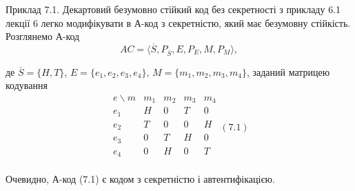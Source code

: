 \begin{example}
    Приклад 7.1. Декартовий безумовно стійкий код без секретності з прикладу
    6.1 лекції 6 легко модифікувати в А-код з секретністю, який має безумовну
    стійкість. Розглянемо А-код
    \begin{equation*}
        AC = \langle \overline{S}, P_{\overline{S}}, E, P_E, M, P_M \rangle,
    \end{equation*}
    
    де $\overline{S} = \{H, T\}$, $E = \{e_1, e_2, e_3, e_4\}$, $M = \{m_1, m_2, m_3, m_4\}$, заданий матрицею
    кодування
    \begin{equation}
        \begin{matrix}
            e \backslash m & m_1 & m_2 & m_3 & m_4 \\
            e_1 & H & 0 & T & 0 \\
            e_2 & T & 0 & 0 & H \\
            e_3 & 0 & T & H & 0 \\
            e_4 & 0 & H & 0 & T \\
        \end{matrix} (7.1)
    \end{equation}
    
    Очевидно, А-код (7.1) є кодом з секретністю і автентифікацією.
\end{example}

